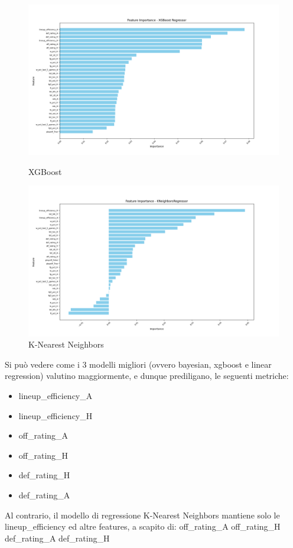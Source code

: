 \begin{figure}[H]
    \centering
    \begin{minipage}[b]{0.45\linewidth}
        \centering
        \includegraphics[width=\linewidth]{img/xgboost.png}
        \caption{XGBoost}
        \label{fig:first_label}
    \end{minipage}
    \hspace{0.05\linewidth}
    \begin{minipage}[b]{0.45\linewidth}
        \centering
        \includegraphics[width=\linewidth]{img/knn.png}
        \caption{K-Nearest Neighbors}
        \label{fig:second_label}
    \end{minipage}
\end{figure}

Si può vedere come i 3 modelli migliori (ovvero bayesian, xgboost e linear regression) valutino maggiormente, e dunque prediligano, le seguenti metriche:
\begin{itemize}
    \item lineup\_efficiency\_A
    \item lineup\_efficiency\_H
    \item off\_rating\_A
    \item off\_rating\_H
    \item def\_rating\_H
    \item def\_rating\_A
\end{itemize} 
Al contrario, il modello di regressione K-Nearest Neighbors mantiene solo le lineup\_efficiency ed altre features, a scapito di:
off\_rating\_A
off\_rating\_H
def\_rating\_A
def\_rating\_H

\newpage

